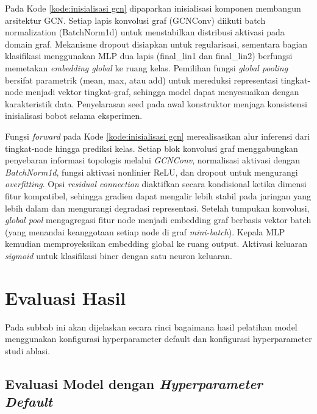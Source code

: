  Pada Kode \ref{kode:inisialisasi gcn} dipaparkan inisialisasi komponen membangun arsitektur GCN. Setiap lapis konvolusi graf (GCNConv) diikuti batch normalization (BatchNorm1d) untuk menstabilkan distribusi aktivasi pada domain graf. Mekanisme dropout disiapkan untuk regularisasi, sementara bagian klasifikasi menggunakan MLP dua lapis (final\_lin1 dan final\_lin2) berfungsi memetakan \textit{embedding global} ke ruang kelas. Pemilihan fungsi \textit{global pooling} bersifat parametrik (mean, max, atau add) untuk mereduksi representasi tingkat-node menjadi vektor tingkat-graf, sehingga model dapat menyesuaikan dengan karakteristik data. Penyelarasan seed pada awal konstruktor menjaga konsistensi inisialisasi bobot selama eksperimen. \par

Fungsi \textit{forward} pada Kode \ref{kode:inisialisasi gcn} merealisasikan alur inferensi dari tingkat-node hingga prediksi kelas. Setiap blok konvolusi graf menggabungkan penyebaran informasi topologis melalui \textit{GCNConv}, normalisasi aktivasi dengan \textit{BatchNorm1d}, fungsi aktivasi nonlinier ReLU, dan dropout untuk mengurangi \textit{overfitting}. Opsi \textit{residual connection} diaktifkan secara kondisional ketika dimensi fitur kompatibel, sehingga gradien dapat mengalir lebih stabil pada jaringan yang lebih dalam dan mengurangi degradasi representasi. Setelah tumpukan konvolusi, \textit{global pool} mengagregasi fitur node menjadi embedding graf berbasis vektor batch (yang menandai keanggotaan setiap node di graf \textit{mini-batch}). Kepala MLP kemudian memproyeksikan embedding global ke ruang output. Aktivasi keluaran \textit{sigmoid} untuk klasifikasi biner dengan satu neuron keluaran. \par

\section{Evaluasi Hasil} \label{IV.evaluasi}
Pada subbab ini akan dijelaskan secara rinci bagaimana hasil pelatihan model menggunakan konfigurasi hyperparameter default dan konfigurasi hyperparameter studi ablasi. \par

\subsection{Evaluasi Model dengan \textit{Hyperparameter Default}} \label{IV.evaluasi-default}

